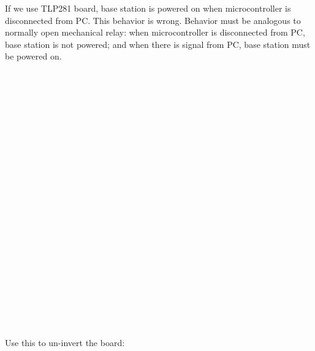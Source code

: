 \nopagenumbers
If we use TLP281 board, base station is powered on when microcontroller is disconnected from PC.
This behavior is wrong. Behavior must be analogous to normally open mechanical relay: when
microcontroller is disconnected from PC, base station is not powered; and when
there is signal from PC, base station must be powered on.
$$\hbox to15.38cm{\vbox to7.26722222222222cm{\vfil\special{psfile=tlp1.eps
  clip llx=0 lly=0 urx=436 ury=206 rwi=4360}}\hfil}$$
$$\hbox to16cm{\vbox to5.82cm{\vfil\special{psfile=tlp2.eps
  clip llx=0 lly=0 urx=863 ury=314 rwi=4535}}\hfil}$$
Use this to un-invert the board:
$$\hbox to7.26cm{\vbox to6.24416666666667cm{\vfil\special{psfile=tlp.1
  clip llx=-1 lly=-33 urx=205 ury=144 rwi=2060}}\hfil}$$
\bye
